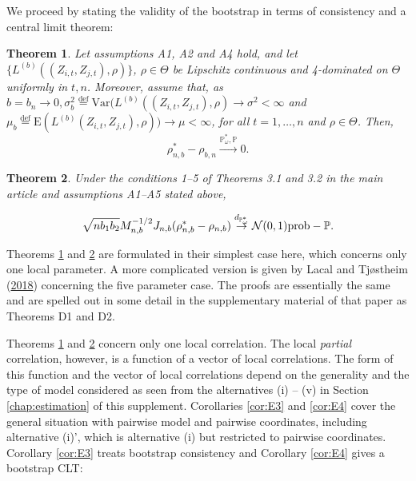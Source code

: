 \documentclass[
  12pt,
  letterpaper]{article}
\newtheorem{thm}{Theorem}[section]
\numberwithin{equation}{section}
\newcommand{\E}{\textrm{E}}
\newcommand{\Var}{\textrm{Var}}
\begin{document}
We proceed by stating the validity of the bootstrap in terms of consistency and a central limit theorem:

\begin{thm}
Let assumptions A1, A2 and A4 hold, and  let $\{L^{(b)}((Z_{i,t},Z_{j,t}),\rho)\}$, $\rho \in \Theta$ be Lipschitz continuous and 4-dominated on $\Theta$ uniformly in $t,n$. Moreover, assume that, as $b=b_n \to 0, \sigma_b^2 \stackrel{\textrm{def}}{=} \Var(L^{(b)}((Z_{i,t},Z_{j,t}),\rho) \to \sigma^2 < \infty$ and $\mu_b \stackrel{\textrm{def}}{=} \E(L^{(b)}(Z_{i,t},Z_{j,t}),\rho)) \to \mu < \infty$, for all $t=1,\ldots,n$ and $\rho \in \Theta$. 
Then,
\begin{equation}
\rho_{n,b}^* - \rho_{b,n} \stackrel {\mathbb{P}_{\omega}^{*},\mathbb{P}}{\to} 0.
\label{eq:thmB}
\end{equation}
\label{thm:E1}
\end{thm}

\begin{thm}
Under the conditions 1--5 of Theorems 3.1 and 3.2 in the  main article and assumptions A1--A5 stated above,

\begin{equation}
\sqrt{nb_1b_2} M_{n,b}^{-1/2}J_{n,b}(\rho_{n,b}^{*} - \rho_{n,b}) \stackrel {d_{\mathbb{P}_{\omega}^{*}}}{\to} {\cal N}(0,1)\mbox{prob}-\mathbb{P}.
\end{equation}
\label{thm:E2}
\end{thm}

Theorems \ref{thm:E1} and \ref{thm:E2} are formulated in their simplest case here, which concerns only one local parameter. A more complicated version is given by Lacal and Tjøstheim (\protect\hyperlink{ref-lacal2018estimating}{2018}) concerning the five parameter case. The proofs are essentially the same and are spelled out in some detail in the supplementary material of that paper as Theorems D1 and D2.

Theorems \ref{thm:E1} and \ref{thm:E2} concern only one local correlation. The local \emph{partial} correlation, however, is a function of a vector of local correlations. The form of this function and the vector of local correlations depend on the generality and the type of model considered as seen from the alternatives (i) -- (v) in Section \ref{chap:estimation} of this supplement. Corollaries \ref{cor:E3} and \ref{cor:E4} cover the general situation with pairwise model and pairwise coordinates, including alternative (i)', which is alternative (i) but restricted to pairwise coordinates. Corollary \ref{cor:E3} treats bootstrap consistency and Corollary \ref{cor:E4} gives a bootstrap CLT:
\end{document}
